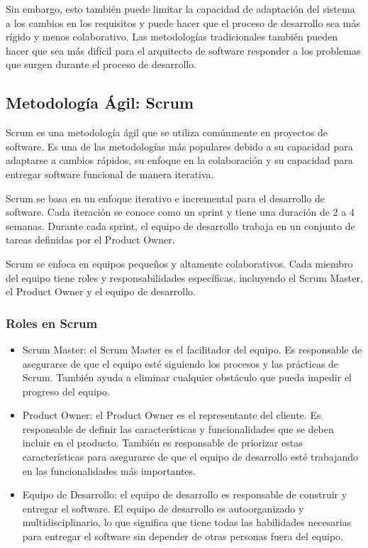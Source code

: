 \documentclass[executivepaper]{article}
\begin{document}
Sin embargo, esto también puede limitar la capacidad de adaptación del sistema a los cambios en los requisitos y puede hacer que el proceso de desarrollo sea más rígido y menos colaborativo. Las metodologías tradicionales también pueden hacer que sea más difícil para el arquitecto de software responder a los problemas que surgen durante el proceso de desarrollo.

\newpage
\subsection{Metodología Ágil: Scrum}

Scrum es una metodología ágil que se utiliza comúnmente en proyectos de software. Es una de las metodologías más populares debido a su capacidad para adaptarse a cambios rápidos, su enfoque en la colaboración y su capacidad para entregar software funcional de manera iterativa.

Scrum se basa en un enfoque iterativo e incremental para el desarrollo de software. Cada iteración se conoce como un sprint y tiene una duración de 2 a 4 semanas. Durante cada sprint, el equipo de desarrollo trabaja en un conjunto de tareas definidas por el Product Owner.

Scrum se enfoca en equipos pequeños y altamente colaborativos. Cada miembro del equipo tiene roles y responsabilidades específicas, incluyendo el Scrum Master, el Product Owner y el equipo de desarrollo.

\subsubsection*{Roles en Scrum}

\begin{itemize}
\item Scrum Master: el Scrum Master es el facilitador del equipo. Es responsable de asegurarse de que el equipo esté siguiendo los procesos y las prácticas de Scrum. También ayuda a eliminar cualquier obstáculo que pueda impedir el progreso del equipo.
\item Product Owner: el Product Owner es el representante del cliente. Es responsable de definir las características y funcionalidades que se deben incluir en el producto. También es responsable de priorizar estas características para asegurarse de que el equipo de desarrollo esté trabajando en las funcionalidades más importantes.
\item Equipo de Desarrollo: el equipo de desarrollo es responsable de construir y entregar el software. El equipo de desarrollo es autoorganizado y multidisciplinario, lo que significa que tiene todas las habilidades necesarias para entregar el software sin depender de otras personas fuera del equipo.
\end{itemize}
\end{document}
